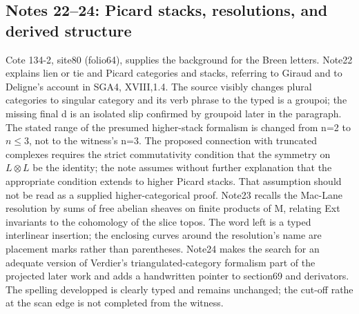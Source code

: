 \subsection*{Notes 22--24: Picard stacks, resolutions, and derived structure}
Cote 134-2, site80 (folio64), supplies the background for the Breen letters. Note22 explains lien or tie and Picard categories and stacks, referring to Giraud and to Deligne's account in SGA4, XVIII,1.4. The source visibly changes plural categories to singular category and its verb phrase to the typed is a groupoi; the missing final d is an isolated slip confirmed by groupoid later in the paragraph. The stated range of the presumed higher-stack formalism is changed from n=2 to $n\leq3$, not to the witness's n=3. The proposed connection with truncated complexes requires the strict commutativity condition that the symmetry on $L\otimes L$ be the identity; the note assumes without further explanation that the appropriate condition extends to higher Picard stacks. That assumption should not be read as a supplied higher-categorical proof. Note23 recalls the Mac-Lane resolution by sums of free abelian sheaves on finite products of M, relating Ext invariants to the cohomology of the slice topos. The word left is a typed interlinear insertion; the enclosing curves around the resolution's name are placement marks rather than parentheses. Note24 makes the search for an adequate version of Verdier's triangulated-category formalism part of the projected later work and adds a handwritten pointer to section69 and derivators. The spelling developped is clearly typed and remains unchanged; the cut-off rathe at the scan edge is not completed from the witness.

